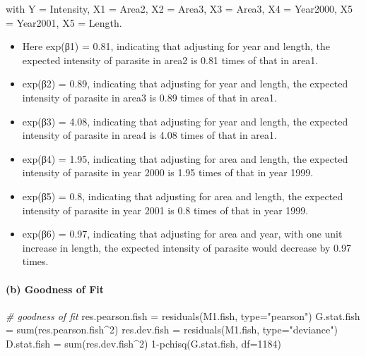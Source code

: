 \documentclass[
]{article}
\newenvironment{Shaded}{\begin{snugshade}}{\end{snugshade}}
\newcommand{\AttributeTok}[1]{\textcolor[rgb]{0.77,0.63,0.00}{#1}}
\newcommand{\CommentTok}[1]{\textcolor[rgb]{0.56,0.35,0.01}{\textit{#1}}}
\newcommand{\DecValTok}[1]{\textcolor[rgb]{0.00,0.00,0.81}{#1}}
\newcommand{\FunctionTok}[1]{\textcolor[rgb]{0.00,0.00,0.00}{#1}}
\newcommand{\NormalTok}[1]{#1}
\newcommand{\OtherTok}[1]{\textcolor[rgb]{0.56,0.35,0.01}{#1}}
\newcommand{\SpecialCharTok}[1]{\textcolor[rgb]{0.00,0.00,0.00}{#1}}
\newcommand{\StringTok}[1]{\textcolor[rgb]{0.31,0.60,0.02}{#1}}
\begin{document}
with Y = Intensity, X1 = Area2, X2 = Area3, X3 = Area3, X4 = Year2000,
X5 = Year2001, X5 = Length.

\begin{itemize}
\item
  Here exp(β1) = 0.81, indicating that adjusting for year and length,
  the expected intensity of parasite in area2 is 0.81 times of that in
  area1.
\item
  exp(β2) = 0.89, indicating that adjusting for year and length, the
  expected intensity of parasite in area3 is 0.89 times of that in
  area1.
\item
  exp(β3) = 4.08, indicating that adjusting for year and length, the
  expected intensity of parasite in area4 is 4.08 times of that in
  area1.
\item
  exp(β4) = 1.95, indicating that adjusting for area and length, the
  expected intensity of parasite in year 2000 is 1.95 times of that in
  year 1999.
\item
  exp(β5) = 0.8, indicating that adjusting for area and length, the
  expected intensity of parasite in year 2001 is 0.8 times of that in
  year 1999.
\item
  exp(β6) = 0.97, indicating that adjusting for area and year, with one
  unit increase in length, the expected intensity of parasite would
  decrease by 0.97 times.
\end{itemize}

\hypertarget{b-goodness-of-fit}{%
\paragraph{(b) Goodness of Fit}\label{b-goodness-of-fit}}

\begin{Shaded}
\begin{Highlighting}[]
\CommentTok{\# goodness of fit}
\NormalTok{res.pearson.fish }\OtherTok{=} \FunctionTok{residuals}\NormalTok{(M1.fish, }\AttributeTok{type=}\StringTok{"pearson"}\NormalTok{)}
\NormalTok{G.stat.fish }\OtherTok{=} \FunctionTok{sum}\NormalTok{(res.pearson.fish}\SpecialCharTok{\^{}}\DecValTok{2}\NormalTok{)}
\NormalTok{res.dev.fish }\OtherTok{=} \FunctionTok{residuals}\NormalTok{(M1.fish, }\AttributeTok{type=}\StringTok{"deviance"}\NormalTok{)}
\NormalTok{D.stat.fish }\OtherTok{=} \FunctionTok{sum}\NormalTok{(res.dev.fish}\SpecialCharTok{\^{}}\DecValTok{2}\NormalTok{)}
\DecValTok{1}\SpecialCharTok{{-}}\FunctionTok{pchisq}\NormalTok{(G.stat.fish, }\AttributeTok{df=}\DecValTok{1184}\NormalTok{)}
\end{Highlighting}
\end{Shaded}
\end{document}
